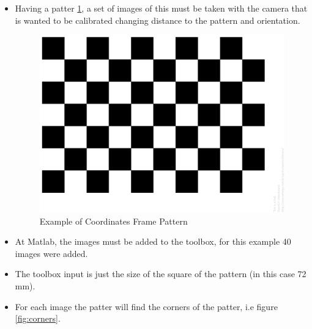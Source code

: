 \documentclass[12pt]{scrartcl}
\begin{document}
\begin{itemize}
\item Having a patter \ref{fig:pattern}, a set of images of this must be taken with the camera that is wanted to be calibrated changing distance to the pattern and orientation.
\begin{figure}[h!]
\centering
\includegraphics[scale= 0.25,clip]{images/pattern}
\caption{Example of Coordinates Frame Pattern}
\label{fig:pattern}
\end{figure}
\item At Matlab, the images must be added to the toolbox, for this example 40 images were added.
\item The toolbox input is just the size of the square of the pattern (in this case 72 mm).
\item For each image the patter will find the corners of the patter, i.e figure \ref{fig:corners}.


\end{itemize}
\end{document}
